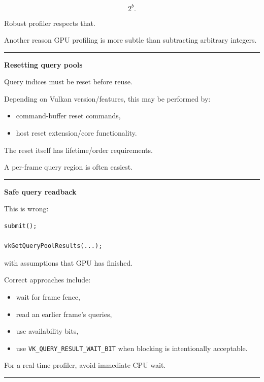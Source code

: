 \[
2^b.
\]

Robust profiler respects that.

Another reason GPU profiling is more subtle than subtracting arbitrary integers.

\begin{center}\rule{0.5\linewidth}{0.5pt}\end{center}

\textbf{Resetting query pools}

Query indices must be reset before reuse.

Depending on Vulkan version/features, this may be performed by:

\begin{itemize}
\tightlist
\item
  command-buffer reset commands,
\item
  host reset extension/core functionality.
\end{itemize}

The reset itself has lifetime/order requirements.

A per-frame query region is often easiest.

\begin{center}\rule{0.5\linewidth}{0.5pt}\end{center}

\textbf{Safe query readback}

This is wrong:

\begin{verbatim}
submit();

vkGetQueryPoolResults(...);
\end{verbatim}

with assumptions that GPU has finished.

Correct approaches include:

\begin{itemize}
\tightlist
\item
  wait for frame fence,
\item
  read an earlier frame's queries,
\item
  use availability bits,
\item
  use \texttt{VK\_QUERY\_RESULT\_WAIT\_BIT} when blocking is intentionally acceptable.
\end{itemize}

For a real-time profiler, avoid immediate CPU wait.

\begin{center}\rule{0.5\linewidth}{0.5pt}\end{center}

